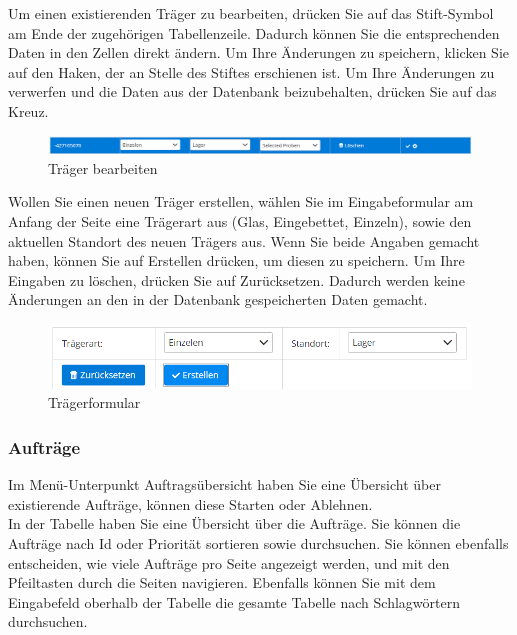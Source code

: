 \documentclass[enabledeprecatedfontcommands,fontsize=12pt,paper=a4,twoside]{scrartcl}
\begin{document}
Um einen existierenden Träger zu bearbeiten, drücken Sie auf das Stift-Symbol am Ende der zugehörigen Tabellenzeile. Dadurch können Sie die entsprechenden Daten in den Zellen direkt ändern. Um Ihre Änderungen zu speichern, klicken Sie auf den Haken, der an Stelle des Stiftes erschienen ist. Um Ihre Änderungen zu verwerfen und die Daten aus der Datenbank beizubehalten, drücken Sie auf das Kreuz. \\

\begin{figure}[h!]
\begin{center}
 \includegraphics[width=\textwidth]{screenshots/l/trageredit.png}
  \caption{Träger bearbeiten}
  \label{fig:boat1}
\end{center}
\end{figure}

Wollen Sie einen neuen Träger erstellen, wählen Sie im Eingabeformular am Anfang der Seite eine Trägerart aus (Glas, Eingebettet, Einzeln), sowie den aktuellen Standort des neuen Trägers aus. Wenn Sie beide Angaben gemacht haben, können Sie auf Erstellen drücken, um diesen zu speichern. Um Ihre Eingaben zu löschen, drücken Sie auf Zurücksetzen. Dadurch werden keine Änderungen an den in der Datenbank gespeicherten Daten gemacht. \\

\begin{figure}[h!]
\begin{center}
 \includegraphics[width=\textwidth]{screenshots/l/tragerform.png}
  \caption{Trägerformular}
  \label{fig:boat1}
\end{center}
\end{figure}

\subsubsection{Aufträge}
Im Menü-Unterpunkt Auftragsübersicht haben Sie eine Übersicht über existierende Aufträge, können diese Starten oder Ablehnen.\\

In der Tabelle haben Sie eine Übersicht über die Aufträge. Sie können die Aufträge nach Id oder Priorität sortieren sowie durchsuchen. Sie können ebenfalls entscheiden, wie viele Aufträge pro Seite angezeigt werden, und mit den Pfeiltasten durch die Seiten navigieren. Ebenfalls können Sie mit dem Eingabefeld oberhalb der Tabelle die gesamte Tabelle nach Schlagwörtern durchsuchen. \\
\end{document}
